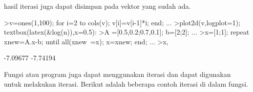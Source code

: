 \documentclass[a4paper,10pt]{article}
\begin{document}
\begin{eulernotebook}
\begin{eulercomment}
\begin{eulercomment}
\begin{eulercomment}
\begin{eulercomment}
\begin{eulercomment}
\begin{eulercomment}
\begin{eulercomment}
\begin{eulercomment}
\begin{eulercomment}
\begin{eulercomment}
\begin{eulercomment}
\begin{eulercomment}
\begin{eulercomment}
\begin{eulercomment}
\begin{eulercomment}
\begin{eulercomment}
\begin{eulercomment}
\begin{eulercomment}
\begin{eulercomment}
\begin{eulercomment}
\begin{eulercomment}
\begin{eulercomment}
\begin{eulercomment}
\begin{eulercomment}
\begin{euleroutput}
  [1,  2,  6,  24,  120,  720,  5040,  40320]
\end{euleroutput}
\begin{eulercomment}
hasil iterasi juga dapat disimpan pada vektor yang sudah ada.
\end{eulercomment}
\begin{eulerprompt}
>v=ones(1,100); for i=2 to cols(v); v[i]=v[i-1]*i; end; ...
>plot2d(v,logplot=1); textbox(latex(&log(n)),x=0.5):
>A =[0.5,0.2;0.7,0.1]; b=[2;2]; ...
>x=[1;1]; repeat xnew=A.x-b; until all(xnew~=x); x=xnew; end; ...
>x,
\end{eulerprompt}
\begin{euleroutput}
       -7.09677 
       -7.74194 
\end{euleroutput}
\begin{eulercomment}
Fungsi atau program juga dapat menggunakan iterasi dan dapat digunakan untuk melakukan iterasi. Berikut adalah beberapa contoh
iterasi di dalam fungsi.


\end{eulercomment}
\end{eulercomment}
\end{eulercomment}
\end{eulercomment}
\end{eulercomment}
\end{eulercomment}
\end{eulercomment}
\end{eulercomment}
\end{eulercomment}
\end{eulercomment}
\end{eulercomment}
\end{eulercomment}
\end{eulercomment}
\end{eulercomment}
\end{eulercomment}
\end{eulercomment}
\end{eulercomment}
\end{eulercomment}
\end{eulercomment}
\end{eulercomment}
\end{eulercomment}
\end{eulercomment}
\end{eulercomment}
\end{eulercomment}
\end{eulercomment}
\end{eulernotebook}
\end{document}
